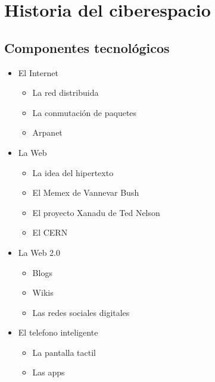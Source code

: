 \documentclass[]{book}
\providecommand{\tightlist}{%
  \setlength{\itemsep}{0pt}\setlength{\parskip}{0pt}}
\begin{document}
\hypertarget{historia-del-ciberespacio}{%
\chapter{Historia del ciberespacio}\label{historia-del-ciberespacio}}

\hypertarget{componentes-tecnoluxf3gicos}{%
\section{Componentes tecnológicos}\label{componentes-tecnoluxf3gicos}}

\begin{itemize}
\tightlist
\item
  El Internet

  \begin{itemize}
  \tightlist
  \item
    La red distribuida
  \item
    La conmutación de paquetes
  \item
    Arpanet\\
  \end{itemize}
\item
  La Web

  \begin{itemize}
  \tightlist
  \item
    La idea del hipertexto\\
  \item
    El Memex de Vannevar Bush
  \item
    El proyecto Xanadu de Ted Nelson\\
  \item
    El CERN\\
  \end{itemize}
\item
  La Web 2.0

  \begin{itemize}
  \tightlist
  \item
    Blogs
  \item
    Wikis
  \item
    Las redes sociales digitales\\
  \end{itemize}
\item
  El telefono inteligente

  \begin{itemize}
  \tightlist
  \item
    La pantalla tactil
  \item
    Las apps
  \end{itemize}
\end{itemize}
\end{document}
